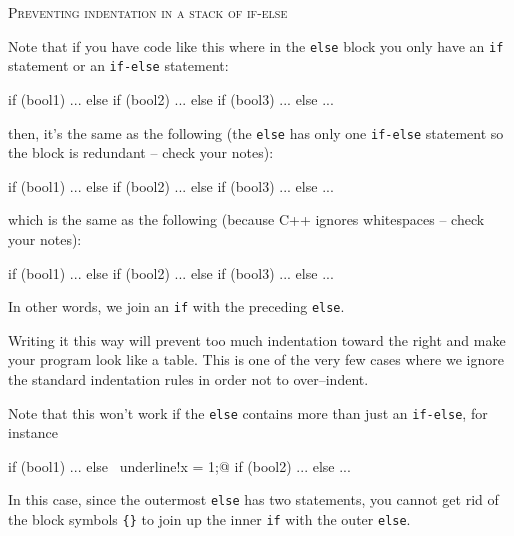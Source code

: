 \textsc{Preventing indentation in a stack of if-else}

Note that if you have code like this where 
in the \verb!else! block you only have an 
\verb!if! statement or an 
\verb!if-else! statement:
{\footnotesize
\begin{console}
if (bool1)
{
   ...
}
else
{
    if (bool2)
    {
        ...
    }
    else
    {
        if (bool3)
        {
            ...
        }
        else
        {
            ...
        }
    }
}
\end{console}
}
then, it's the same as the following 
(the \verb!else! has only one \verb!if-else! statement
so the block is redundant -- check your notes):
{\footnotesize
\begin{console}
if (bool1)
{
   ...
}
else
    if (bool2)
    {
        ...
    }
    else
        if (bool3)
        {
            ...
        }
        else
        {
            ...
        }
\end{console}
}
which is the same as the following (because
 C++ ignores whitespaces -- check your notes):
{\footnotesize
\begin{console}
if (bool1)
{
   ...
}
else if (bool2)
{
    ...
}
else if (bool3)
{
    ...
}
else
{
    ...
}
\end{console}
}
In other words, we join an \verb!if! with the preceding \verb!else!.

Writing it this way will prevent too much indentation toward the 
right and make your program look like a table.
This is one of the very few cases where we ignore the standard
indentation rules in order not to over--indent.

Note that this won't work if the \verb!else! contains more than
just an \verb!if-else!, for instance
{\footnotesize
\begin{console}[commandchars=\~\!\@]
if (bool1)
{
   ...
}
else
{
    ~underline!x = 1;@
    if (bool2)
    {
        ...
    }
    else
    {
        ...
    }
}
\end{console}
}
In this case, since the outermost \verb!else! has two statements,
you cannot get rid of the block symbols \verb!{}! to join up the 
inner \verb!if! with the outer \verb!else!.
